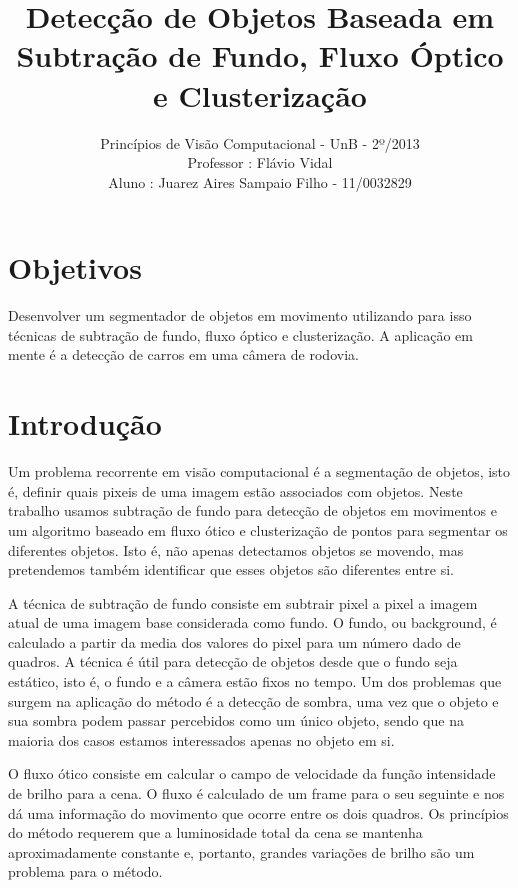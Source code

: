 \documentclass[journal]{IEEEtran}
\begin{document}
\title{ 
Detecção de Objetos Baseada em Subtração de Fundo, Fluxo Óptico e 
Clusterização}
\author{
		Princípios de Visão Computacional - UnB - 2º/2013 \\
		Professor : Flávio Vidal \\
		Aluno : Juarez Aires Sampaio Filho - 11/0032829 \\
		}


\maketitle
\IEEEpeerreviewmaketitle

\section{Objetivos} 
Desenvolver um segmentador de objetos em movimento utilizando para 
isso técnicas de subtração de fundo, fluxo óptico e clusterização.
A aplicação em mente é a detecção de carros em uma câmera de rodovia.

\section{Introdução}
    Um problema recorrente em visão computacional é 
a segmentação de objetos, isto é, definir quais pixeis de uma
imagem estão associados com objetos. Neste trabalho usamos subtração
de fundo para detecção de objetos em movimentos e um algoritmo baseado
em fluxo ótico e clusterização de pontos para segmentar os diferentes 
objetos. Isto é, não apenas detectamos objetos se movendo, mas 
pretendemos também identificar que esses objetos são diferentes 
entre si.

    A técnica de subtração de fundo consiste em subtrair pixel a 
pixel a imagem atual de uma imagem base considerada como fundo.
O fundo, ou background, é calculado a partir da media dos valores do 
pixel para um número dado de quadros. A técnica é útil para detecção 
de objetos desde que o fundo seja estático, isto é, o fundo e a câmera
estão fixos no tempo. Um dos problemas que surgem na aplicação do 
método é a detecção de sombra, uma vez que o objeto e sua sombra 
podem passar percebidos como um único objeto, sendo que na maioria 
dos casos estamos interessados apenas no objeto em si.

    O fluxo ótico consiste em calcular o campo de velocidade da 
função intensidade de brilho para a cena. O fluxo é calculado de um 
frame para o seu seguinte e nos dá uma informação do movimento que 
ocorre entre os dois quadros. Os princípios do método requerem que a 
luminosidade total da cena se mantenha aproximadamente constante e, 
portanto, grandes variações de brilho são um problema para o método.
\end{document}
